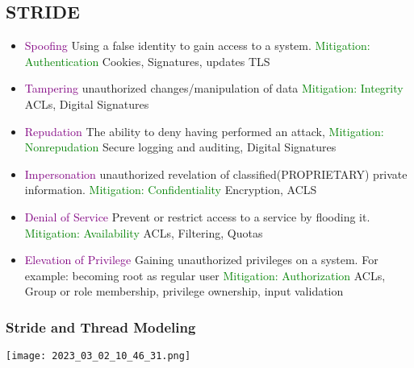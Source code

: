 \documentclass[main.tex,fontsize=8pt,paper=a4,paper=portrait,DIV=calc,]{scrartcl}
\begin{document}
\subsection{STRIDE}
\begin{itemize}
\item \textcolor{purple}{Spoofing}\newline
Using a false identity to gain access to a system.\newline
\textcolor{green}{Mitigation: Authentication} Cookies, Signatures, updates TLS
\item \textcolor{purple}{Tampering}\newline
unauthorized changes/manipulation of data\newline
\textcolor{green}{Mitigation: Integrity} ACLs, Digital Signatures
\item \textcolor{purple}{Repudation}\newline
The ability to deny having performed an attack,\newline
\textcolor{green}{Mitigation: Nonrepudation} Secure logging and auditing, Digital Signatures
\item \textcolor{purple}{Impersonation}\newline
unauthorized revelation of classified(PROPRIETARY) private information.\newline
\textcolor{green}{Mitigation: Confidentiality} Encryption, ACLS
\item \textcolor{purple}{Denial of Service}\newline
Prevent or restrict access to a service by flooding it.\newline
\textcolor{green}{Mitigation: Availability} ACLs, Filtering, Quotas
\item \textcolor{purple}{Elevation of Privilege}\newline
Gaining unauthorized privileges on a system. For example: becoming root as regular user\newline
\textcolor{green}{Mitigation: Authorization} ACLs, Group or role membership, privilege ownership, input validation
\end{itemize} 

\subsubsection{Stride and Thread Modeling}
\texttt{[image: 2023\_03\_02\_10\_46\_31.png]}
\end{document}
